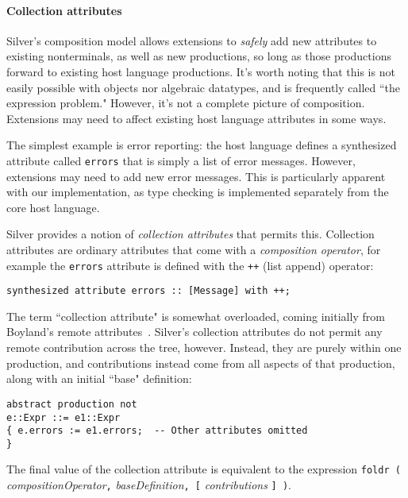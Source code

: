 \paragraph{Collection attributes}
Silver's composition model allows extensions to \textit{safely} add new attributes
to existing nonterminals, as well as new productions, so long as those productions forward
to existing host language productions.
%
%
It's worth noting that this is not easily possible
with objects nor algebraic datatypes, and is frequently called ``the expression
problem."
%
However, it's not a complete picture of composition.
%
Extensions may need to affect existing host language attributes in some ways.

The simplest example is error reporting: the host language defines a synthesized
attribute called \texttt{errors} that is simply a list of error messages.
%
However, extensions may need to add new error messages.
%
This is particularly apparent with our implementation, as type checking is
implemented separately from the core host language.

Silver provides a notion of \textit{collection attributes} that permits this.
%
Collection attributes are ordinary attributes that come with a
\textit{composition operator}, for example the \texttt{errors} attribute
is defined with the \texttt{++} (list append) operator:
%
\begin{verbatim}
synthesized attribute errors :: [Message] with ++;
\end{verbatim}
%
The term ``collection attribute" is somewhat overloaded, coming initially
from Boyland's remote attributes~\cite{boyland05}.
%
Silver's collection attributes do not permit any remote contribution across
the tree, however.
%
Instead, they are purely within one production, and contributions instead come
from all aspects of that production, along with an initial ``base" definition:
\begin{verbatim}
abstract production not
e::Expr ::= e1::Expr
{ e.errors := e1.errors;  -- Other attributes omitted
}
\end{verbatim}
%
%
The final value of the collection attribute is equivalent to the
expression \texttt{foldr (} \emph{compositionOperator}\texttt{,}
    \emph{baseDefinition}\texttt{, [} \emph{contributions} \texttt{] )}.

